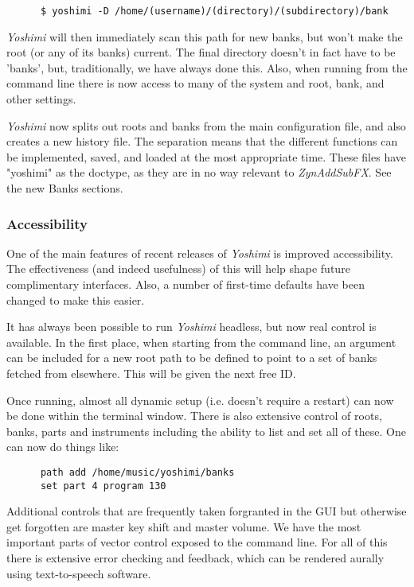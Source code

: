 \documentclass[
 11pt,
 twoside,
 a4paper,
 final                                 %
]{article}
\begin{document}
   \begin{verbatim}
      $ yoshimi -D /home/(username)/(directory)/(subdirectory)/bank
   \end{verbatim}

   \textsl{Yoshimi} will then immediately scan this path for new banks, but
   won't make the root (or any of its banks) current. The final directory
   doesn't in fact have to be 'banks', but, traditionally, we have always done
   this.  Also, when running from the command line there is now access to many
   of the system and root, bank, and other settings.

	\textsl{Yoshimi} now splits out roots and banks from the main configuration
	file, and also creates a new history file. The separation means that the
	different functions can be implemented, saved, and loaded at the most
   appropriate time. These files have
   "yoshimi" as the doctype, as they are in no way relevant to
   \textsl{ZynAddSubFX}.
   See the new Banks sections.

\subsubsection{Accessibility}
\label{subsubsec:new_features_accessibility}

   One of the main features of recent releases of \textsl{Yoshimi} is improved
   accessibility. The effectiveness (and indeed usefulness) of this will help
   shape future complimentary interfaces. Also, a number of first-time defaults
   have been changed to make this easier.

   It has always been possible to run \textsl{Yoshimi} headless, but now real
   control is available. In the first place, when starting from the command
   line, an argument can be included for a new root path to be defined to point
   to a set of banks fetched from elsewhere. This will be given the next free
   ID.

   Once running, almost all dynamic setup (i.e. doesn't require a restart) can
   now be done within the terminal window. There is also extensive control of
   roots, banks, parts and instruments including the ability to list and set
   all of these. One can now do things like:

   \begin{verbatim}
      path add /home/music/yoshimi/banks
      set part 4 program 130
   \end{verbatim}

   Additional controls that are frequently taken forgranted in the GUI but
   otherwise get forgotten are master key shift and master volume.  We have the
   most important parts of vector control exposed to the command line.
   For all of this there is extensive error checking and feedback, which can be
   rendered aurally using text-to-speech software.
\end{document}
